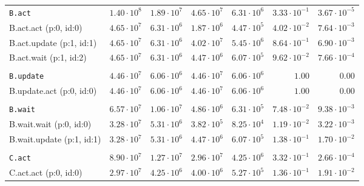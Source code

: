 \begin{table}[htbp]
{\begin{tabular}{lrrrrrr}
\\[-8pt]\texttt{B.act}                & $1.40 \cdot 10^{8}$ & $1.89 \cdot 10^{7}$ & $4.65 \cdot 10^{7}$ & $6.31 \cdot 10^{6}$ & $3.33 \cdot 10^{-1}$ & $3.67 \cdot 10^{-5}$ \\
\hspace{3mm}B.act.act (p:0, id:0)     & $4.65 \cdot 10^{7}$ & $6.31 \cdot 10^{6}$ & $1.87 \cdot 10^{6}$ & $4.47 \cdot 10^{5}$ & $4.02 \cdot 10^{-2}$ & $7.64 \cdot 10^{-3}$ \\
\hspace{3mm}B.act.update (p:1, id:1)  & $4.65 \cdot 10^{7}$ & $6.31 \cdot 10^{6}$ & $4.02 \cdot 10^{7}$ & $5.45 \cdot 10^{6}$ & $8.64 \cdot 10^{-1}$ & $6.90 \cdot 10^{-3}$ \\
\hspace{3mm}B.act.wait (p:1, id:2)    & $4.65 \cdot 10^{7}$ & $6.31 \cdot 10^{6}$ & $4.47 \cdot 10^{6}$ & $6.07 \cdot 10^{5}$ & $9.62 \cdot 10^{-2}$ & $7.66 \cdot 10^{-4}$ \\
\\[-8pt]\texttt{B.update}             & $4.46 \cdot 10^{7}$ & $6.06 \cdot 10^{6}$ & $4.46 \cdot 10^{7}$ & $6.06 \cdot 10^{6}$ &               $1.00$ &               $0.00$ \\
\hspace{3mm}B.update.act (p:0, id:0)  & $4.46 \cdot 10^{7}$ & $6.06 \cdot 10^{6}$ & $4.46 \cdot 10^{7}$ & $6.06 \cdot 10^{6}$ &               $1.00$ &               $0.00$ \\
\\[-8pt]\texttt{B.wait}               & $6.57 \cdot 10^{7}$ & $1.06 \cdot 10^{7}$ & $4.86 \cdot 10^{6}$ & $6.31 \cdot 10^{5}$ & $7.48 \cdot 10^{-2}$ & $9.38 \cdot 10^{-3}$ \\
\hspace{3mm}B.wait.wait (p:0, id:0)   & $3.28 \cdot 10^{7}$ & $5.31 \cdot 10^{6}$ & $3.82 \cdot 10^{5}$ & $8.25 \cdot 10^{4}$ & $1.19 \cdot 10^{-2}$ & $3.22 \cdot 10^{-3}$ \\
\hspace{3mm}B.wait.update (p:1, id:1) & $3.28 \cdot 10^{7}$ & $5.31 \cdot 10^{6}$ & $4.47 \cdot 10^{6}$ & $6.07 \cdot 10^{5}$ & $1.38 \cdot 10^{-1}$ & $1.70 \cdot 10^{-2}$ \\
\\[-8pt]\texttt{C.act}                & $8.90 \cdot 10^{7}$ & $1.27 \cdot 10^{7}$ & $2.96 \cdot 10^{7}$ & $4.25 \cdot 10^{6}$ & $3.32 \cdot 10^{-1}$ & $2.66 \cdot 10^{-4}$ \\
\hspace{3mm}C.act.act (p:0, id:0)     & $2.97 \cdot 10^{7}$ & $4.25 \cdot 10^{6}$ & $4.00 \cdot 10^{6}$ & $5.27 \cdot 10^{5}$ & $1.36 \cdot 10^{-1}$ & $1.91 \cdot 10^{-2}$ \\

\end{tabular}}
\end{table}

